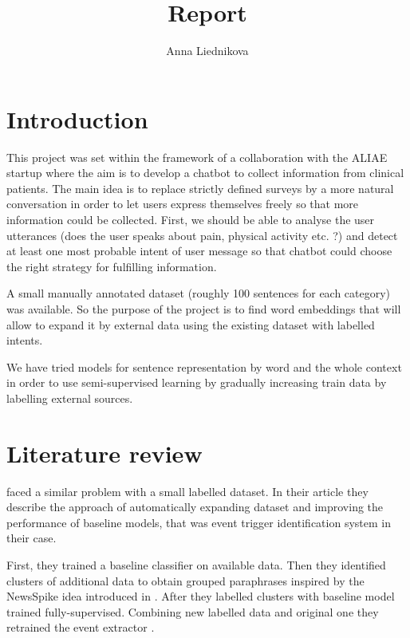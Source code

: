 \documentclass[11pt]{article}
\title{Report}
\author{Anna Liednikova}
\begin{document}
\maketitle

\tableofcontents

\clearpage

\section{Introduction}

 
This project was set within the framework of a collaboration with the ALIAE startup where the aim is to develop a chatbot to collect information from clinical patients. The main idea is to replace strictly defined surveys by a more natural conversation in order to let users express themselves freely so that more information could be collected. First, we should be able to analyse the user utterances (does the user speaks about pain, physical activity etc. ?) and detect at least one most probable intent of user message so that chatbot could choose the right strategy for fulfilling information.


A small manually annotated dataset (roughly 100 sentences for each category) was available. So the purpose of the project is to find word embeddings that will allow to expand it by external data using the existing dataset with labelled intents.

We have tried models for sentence representation by word and the whole context in order to use semi-supervised learning by gradually increasing train data by labelling external sources.

\section{Literature review}

\cite{N18-2058} faced a similar problem with a small labelled dataset. In their article they describe the approach of automatically expanding dataset and improving the performance of baseline models, that was event trigger identification system in their case.

First, they trained a baseline classifier on available data. Then they identified clusters of additional data to obtain grouped paraphrases inspired by the NewsSpike idea introduced in \cite{zhang2015}. After they labelled clusters with baseline model trained fully-supervised. Combining new labelled data and original one they retrained the event extractor \cite{N18-2058}.
\end{document}
